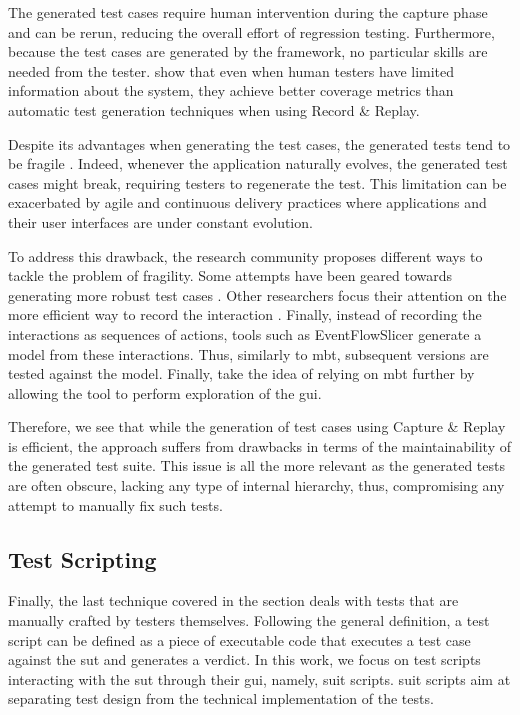 The generated test cases require human intervention during the capture phase and can be rerun, reducing the overall effort of regression testing. Furthermore, because the test cases are generated by the framework, no particular skills are needed from the tester. \textcite{DiMartino2021} show that even when human testers have limited information about the system, they achieve better coverage metrics than automatic test generation techniques when using Record \& Replay.

Despite its advantages when generating the test cases, the generated tests tend to be fragile \cite{Hammoudi2016}. Indeed, whenever the application naturally evolves, the generated test cases might break, requiring testers to regenerate the test. This limitation can be exacerbated by agile and continuous delivery practices where applications and their user interfaces are under constant evolution.

To address this drawback, the research community proposes different ways to tackle the problem of fragility. Some attempts have been geared towards generating more robust test cases \cite{Hammoudi2016b}. Other researchers focus their attention on the more efficient way to record the interaction \cite{Ronsse1999}. Finally, instead of recording the interactions as sequences of actions, tools such as EventFlowSlicer \cite{Saddler2017} generate a model from these interactions. Thus, similarly to \gls{mbt}, subsequent versions are tested against the model. Finally, \textcite{Amalfitano2019} take the idea of relying on \gls{mbt} further by allowing the tool to perform exploration of the \gls{gui}.

Therefore, we see that while the generation of test cases using Capture \& Replay is efficient, the approach suffers from drawbacks in terms of the maintainability of the generated test suite. This issue is all the more relevant as the generated tests are often obscure, lacking any type of internal hierarchy, thus, compromising any attempt to manually fix such tests. 

\subsection{Test Scripting}
\label{sec:introduction-test-scripting}

Finally, the last technique covered in the section deals with tests that are manually crafted by testers themselves. Following the general definition, a test script can be defined as a piece of executable code that executes a test case against the \gls{sut} and generates a verdict. In this work, we focus on test scripts interacting with the \gls{sut} through their \gls{gui}, namely, \gls{suit} scripts. \gls{suit} scripts aim at separating test design from the technical implementation of the tests.

